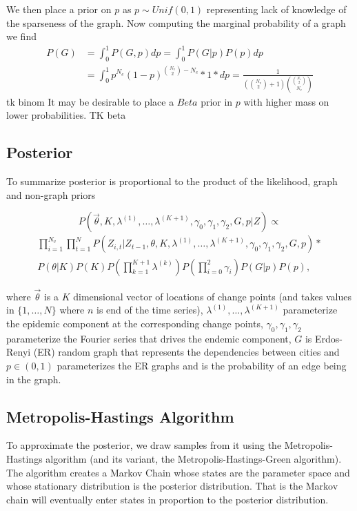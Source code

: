 \documentclass[11pt,a4paper]{article}
\numberwithin{equation}{section}
\begin{document}
We then place a prior on \(p\) as \(p \sim Unif(0,1)\) representing lack
of knowledge of the sparseness of the graph. Now computing the marginal
probability of a graph we find
\[ \begin{aligned} P(G)  & = \int_0^1  P(G,p)dp   = \int_0^1 P(G|p)P(p)dp \\ 
&= \int_0^1 p^{N_e}(1-p)^{\binom{N_v}{2}-N_e}*1*dp = \frac{1}{(\binom{N_v}{2}+1) \binom{\binom{N_v}{2}}{N_e} }  \end{aligned}\]
tk binom It may be desirable to place a \(Beta\) prior in \(p\) with
higher mass on lower probabilities. TK beta

\hypertarget{posterior}{%
\subsection{Posterior}\label{posterior}}

To summarize posterior is proportional to the product of the likelihood,
graph and non-graph priors

\[ P(\vec{\theta}, K, \lambda^{(1)}, \dots, \lambda^{(K+1)}, \gamma_0, \gamma_1, \gamma_2, G,p|Z)  \propto \]
\[\begin{aligned}\prod_{i=1}^{N_v}\prod_{t=1}^N P(Z_{i,t}|Z_{t-1},\theta, K, \lambda^{(1)}, \dots, \lambda^{(K+1)}, \gamma_0, \gamma_1, \gamma_2,G,p)*\\P(\theta|K)P(K)P(\prod_{k=1}^{K+1}\lambda^{(k)} )P(\prod_{i=0}^2 \gamma_i)P(G|p)P(p), \end{aligned} \]

where \(\vec{\theta}\) is a \(K\) dimensional vector of locations of
change points (and takes values in \(\{1,\dots,N\}\) where \(n\) is end
of the time series), \(\lambda^{(1)}, \dots, \lambda^{(K+1)}\)
parameterize the epidemic component at the corresponding change points,
\(\gamma_0, \gamma_1, \gamma_2\) parameterize the Fourier series that
drives the endemic component, \(G\) is Erdos-Renyi (ER) random graph
that represents the dependencies between cities and \(p \in (0,1)\)
parameterizes the ER graphs and is the probability of an edge being in
the graph.

\hypertarget{metropolis-hastings-algorithm}{%
\subsection{Metropolis-Hastings
Algorithm}\label{metropolis-hastings-algorithm}}

To approximate the posterior, we draw samples from it using the
Metropolis-Hastings algorithm (and its variant, the
Metropolis-Hastings-Green algorithm). The algorithm creates a Markov
Chain whose states are the parameter space and whose stationary
distribution is the posterior distribution. That is the Markov chain
will eventually enter states in proportion to the posterior
distribution.
\end{document}
